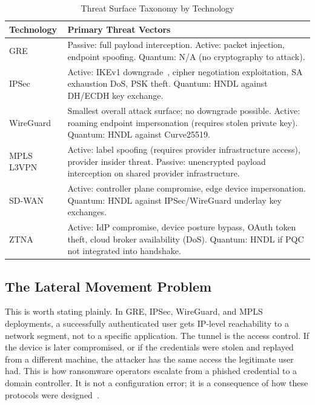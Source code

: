 \documentclass[conference]{IEEEtran}
\begin{document}
\begin{table}[htbp]
\caption{Threat Surface Taxonomy by Technology}
\label{tab:threats}
\centering
\renewcommand{\arraystretch}{1.2}
\begin{tabular}{p{1.3cm}p{6.2cm}}
\toprule
\textbf{Technology} & \textbf{Primary Threat Vectors} \\
\midrule
GRE & Passive: full payload interception. Active: packet injection, endpoint spoofing. Quantum: N/A (no cryptography to attack). \\
\midrule
IPSec & Active: IKEv1 downgrade~\cite{sankaran2023}, cipher negotiation exploitation, SA exhaustion DoS, PSK theft. Quantum: HNDL against DH/ECDH key exchange. \\
\midrule
WireGuard & Smallest overall attack surface; no downgrade possible. Active: roaming endpoint impersonation (requires stolen private key). Quantum: HNDL against Curve25519. \\
\midrule
MPLS L3VPN & Active: label spoofing (requires provider infrastructure access), provider insider threat. Passive: unencrypted payload interception on shared provider infrastructure. \\
\midrule
SD-WAN & Active: controller plane compromise, edge device impersonation. Quantum: HNDL against IPSec/WireGuard underlay key exchanges. \\
\midrule
ZTNA & Active: IdP compromise, device posture bypass, OAuth token theft, cloud broker availability (DoS). Quantum: HNDL if PQC not integrated into handshake. \\
\bottomrule
\end{tabular}
\end{table}

\subsection{The Lateral Movement Problem}

This is worth stating plainly. In GRE, IPSec, WireGuard, and
MPLS deployments, a successfully authenticated user gets
IP-level reachability to a network segment, not to a specific
application. The tunnel is the access control. If the device
is later compromised, or if the credentials were stolen and
replayed from a different machine, the attacker has the same
access the legitimate user had. This is how ransomware operators
escalate from a phished credential to a domain controller.
It is not a configuration error; it is a consequence of how
these protocols were designed~\cite{cybersec2024,tanveer2023}.
\end{document}

